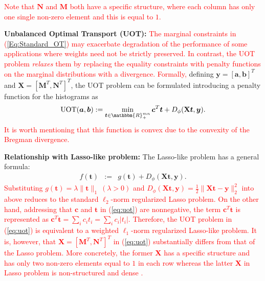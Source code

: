 \documentclass[twoside]{article}
\theoremstyle{plain}
\newcommand{\tranT}{T}
\newcommand{\R}{\mathbbm{R}}
\newcommand{\mat}[1]{\mathbf{#1}}
\renewcommand{\vec}[1]{\bm{#1}}
\newcommand{\changeHK}[1]{\textcolor{red}{#1}}
\begin{document}
 \changeHK{
 Note that $\mat{N}$ and $\mat{M}$ both have a specific structure, where each column has only one single non-zero element and this is equal to $1$. 
 }
 
{\bf Unbalanced Optimal Transport (UOT):} \changeHK{The marginal constraints in (\ref{Eq:Standard_OT}) may exacerbate degradation of the performance of some applications where weights need not be strictly preserved. In contrast, the UOT problem {\it relaxes} them by replacing the equality constraints with penalty functions on the marginal distributions with a divergence. Formally,} defining $\vec{y} = [\vec{a}, \vec{b}]^{\tranT}$ and $\mat{X} = [\mat{M}^{\tranT},\mat{N}^{\tranT}]^{\tranT}$, the UOT problem can be formulated introducing a penalty function for the histograms as \citep{Chapel_NeurIPS_2021}
\begin{equation}
\label{eq:uot}
\operatorname{UOT}(\vec{a},\vec{b}) := \min_{\vec{t} \in \R_{+}^{mn}} \vec{c}^{\tranT}\vec{t} + D_\phi(\mat{X}\vec{t},\vec{y}).
\end{equation}
\changeHK{
It is worth mentioning that this function is convex due to the convexity of the Bregman divergence.
}

{\bf Relationship with Lasso-like problem:} 
The Lasso-like problem has a general formula:
%
\begin{eqnarray*}
f(\vec{t}) &:=& g(\vec{t}) + D_\phi(\mat{X} \vec{t},\vec{y}).
\end{eqnarray*}
 \changeHK{
Substituting $g(\vec{t}) = \lambda \|\vec{t}\|_1~(\lambda > 0)$ and $D_\phi(\mat{X} \vec{t},\vec{y}) = \frac{1}{2}\|\mat{X} \vec{t}-\vec{y}\|_2^2$ into above reduces to the standard $\ell_2$-norm regularized Lasso problem. On the other hand, addressing that $\vec{c}$ and $\vec{t}$ in (\ref{eq:uot}) are nonnegative, the term $\vec{c}^T\vec{t}$ is represented as $\vec{c}^T\vec{t}=\sum_i c_i t_i = \sum_ic_i |t_i|$. Therefore, the UOT problem in (\ref{eq:uot}) is equivalent to a weighted $\ell_1$-norm regularized Lasso-like problem. It is, however, that $\mat{X} = [\mat{M}^{\tranT},\mat{N}^{\tranT}]^{\tranT}$ in (\ref{eq:uot}) substantially differs from that of the Lasso problem. More concretely, the former $\mat{X}$ has a specific structure and has only two non-zero elements equal to $1$ in each row whereas the latter $\mat{X}$ in Lasso problem is non-structured and dense \citep{Chapel_NeurIPS_2021}.
}
\end{document}
